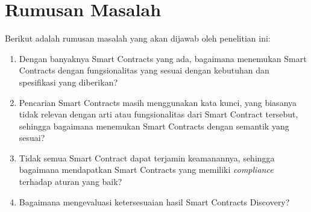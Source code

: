 






\section{Rumusan Masalah}
\label{sec:rumusan-masalah}

Berikut adalah rumusan masalah yang akan dijawab oleh penelitian ini:
\begin{enumerate}
  \item Dengan banyaknya Smart Contracts yang ada, bagaimana menemukan Smart Contracts dengan fungsionalitas yang sesuai dengan kebutuhan dan spesifikasi yang diberikan?
  \item Pencarian Smart Contracts masih menggunakan kata kunci, yang biasanya tidak relevan dengan arti atau fungsionalitas dari Smart Contract tersebut, sehingga bagaimana menemukan Smart Contracts dengan semantik yang sesuai?
  \item Tidak semua Smart Contract dapat terjamin keamanannya, sehingga bagaimana mendapatkan Smart Contracts yang memiliki \textit{compliance} terhadap aturan yang baik?
  \item Bagaimana mengevaluasi ketersesuaian hasil Smart Contracts Discovery?
\end{enumerate}


